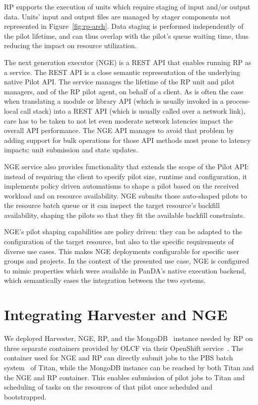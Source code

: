 \documentclass{webofc}
\begin{document}
RP supports the execution of units which require staging of input and/or
output data. Units’ input and output files are managed by stager components
not represented in Figure~\ref{fig:rp-arch}. Data staging is performed
independently of the pilot lifetime, and can thus overlap with the pilot's
queue waiting time, thus reducing the impact on resource utilization.
	
The next generation executor (NGE) is a REST API that enables running RP as a
service. The REST API is a close semantic representation of the underlying
native Pilot API.  The service manages the lifetime of the RP unit and pilot
managers, and of the RP pilot agent, on behalf of a client. As is often the
case when translating a module or library API (which is usually invoked in a
process-local call stack) into a REST API (which is usually called over a
network link), care has to be taken to not let even moderate network
latencies impact the overall API performance.  The NGE API manages to avoid
that problem by adding support for bulk operations for those API methods most
prone to latency impacts: unit submission and state updates.
	
NGE service also provides functionality that extends the scope of the Pilot
API: instead of requiring the client to specify pilot size, runtime and
configuration, it implements policy driven automatisms to shape a pilot based
on the received workload and on resource availability. NGE submits those
auto-shaped pilots to the resource batch queue or it can inspect the target
resource's backfill availability, shaping the pilots so that they fit the
available backfill constraints.
	
NGE's pilot shaping capabilities are policy driven: they can be adapted to
the configuration of the target resource, but also to the specific
requirements of diverse use cases. This makes NGE deployments configurable
for specific user groups and projects. In the context of the presented use
case, NGE is configured to mimic properties which were available in PanDA's
native execution backend, which semantically eases the integration between
the two systems.


\section{Integrating Harvester and NGE}\label{sec:integration}

We deployed Harvester, NGE, RP, and the MongoDB~\cite{chodorow2013mongodb}
instance needed by RP on three separate containers provided by OLCF via their
OpenShift service~\cite{openshift}. The container used for NGE and RP can
directly submit jobs to the PBS batch system~\cite{henderson1995job} of
Titan, while the MongoDB instance can be reached by both Titan and the NGE
and RP container. This enables submission of pilot jobs to Titan and
scheduling of tasks on the resources of that pilot once scheduled and
bootstrapped.
\end{document}
